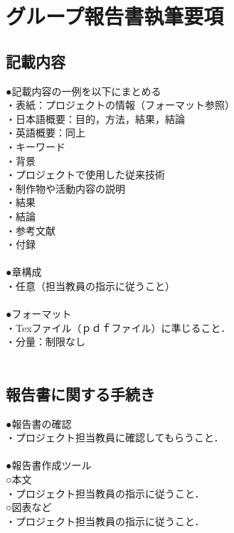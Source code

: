 ﻿\chapter{グループ報告書執筆要項}
\section{記載内容}
\noindent
●記載内容の一例を以下にまとめる\\
・表紙：プロジェクトの情報（フォーマット参照）\\
・日本語概要：目的，方法，結果，結論\\
・英語概要：同上\\
・キーワード\\
・背景\\
・プロジェクトで使用した従来技術\\
・制作物や活動内容の説明\\
・結果\\
・結論\\
・参考文献\\
・付録\\
\\
●章構成\\
・任意（担当教員の指示に従うこと）\\
\\
●フォーマット\\
・Texファイル（ｐｄｆファイル）に準じること．\\
・分量：制限なし\\
\\
\section{報告書に関する手続き}
\noindent
●報告書の確認\\
・プロジェクト担当教員に確認してもらうこと．\\
\\
●報告書作成ツール\\
○本文\\
・プロジェクト担当教員の指示に従うこと．\\
○図表など\\
・プロジェクト担当教員の指示に従うこと．\\
\\
